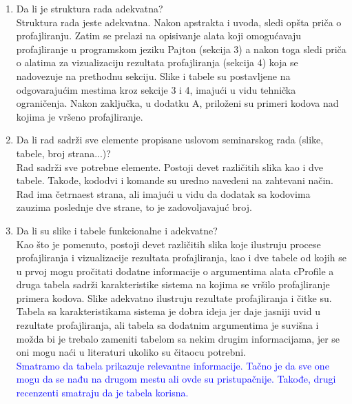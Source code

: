\documentclass[a4paper]{report}
\newcommand{\odgovor}[1]{\textcolor{blue}{#1}}
\begin{document}
\begin{enumerate}
\item Da li je struktura rada adekvatna?\\
Struktura rada jeste adekvatna. Nakon apstrakta i uvoda, sledi opšta priča o profajliranju. Zatim se prelazi na opisivanje alata koji omogućavaju profajliranje u programskom jeziku Pajton (sekcija 3) a nakon toga sledi priča o alatima za vizualizaciju rezultata profajliranja (sekcija 4) koja se nadovezuje na prethodnu sekciju. Slike i tabele su postavljene na odgovarajućim mestima kroz sekcije 3 i 4, imajući u vidu tehnička ograničenja. Nakon zaključka, u dodatku A, priloženi su primeri kodova nad kojima je vršeno profajliranje.

\item Da li rad sadrži sve elemente propisane uslovom seminarskog rada (slike, tabele, broj strana...)?\\
Rad sadrži sve potrebne elemente. Postoji devet različitih slika kao i dve tabele. Takođe, kododvi i komande su uredno navedeni na zahtevani način. Rad ima četrnaest strana, ali imajući u vidu da dodatak sa kodovima zauzima poslednje dve strane, to je zadovoljavajuć broj.

\item Da li su slike i tabele funkcionalne i adekvatne?\\
Kao što je pomenuto, postoji devet različitih slika koje ilustruju procese profajliranja i vizualizacije rezultata profajliranja, kao i dve tabele od kojih se u prvoj mogu pročitati dodatne informacije o argumentima alata cProfile a druga tabela sadrži karakteristike sistema na kojima se vršilo profajliranje primera kodova. Slike adekvatno ilustruju rezultate profajliranja i čitke su. Tabela sa karakteristikama sistema je dobra ideja jer daje jasniji uvid u rezultate profajliranja, ali tabela sa dodatnim argumentima je suvišna i možda bi je trebalo zameniti tabelom sa nekim drugim informacijama, jer se oni mogu naći u literaturi ukoliko su čitaocu potrebni.\\
\odgovor{Smatramo da tabela prikazuje relevantne informacije. Tačno je da sve one mogu da se nađu na drugom mestu ali ovde su pristupačnije. Takođe, drugi recenzenti smatraju da je tabela korisna.}

\end{enumerate}
\end{document}
